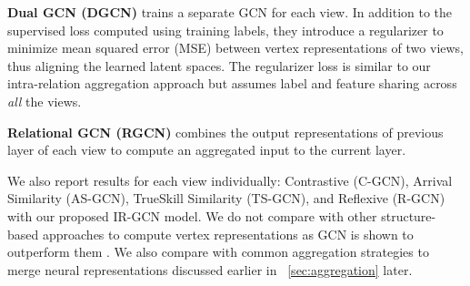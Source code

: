 \noindent
\textbf{Dual GCN (DGCN)} \cite{DualGCN} trains a separate GCN for each view. In addition to the supervised loss computed using training labels, they introduce a regularizer to minimize mean squared error (MSE) between vertex representations of two views, thus aligning the learned latent spaces.
The regularizer loss is similar to our intra-relation aggregation approach but assumes label and feature sharing across \emph{all} the views.

\noindent
\textbf{Relational GCN (RGCN)} \cite{relationalGCN} combines the output representations of previous layer of each view to compute an aggregated input to the current layer.
%

We also report results for each view individually: Contrastive (C-GCN), Arrival Similarity (AS-GCN), TrueSkill Similarity (TS-GCN), and Reflexive (R-GCN) with our proposed IR-GCN model. We do not compare with other structure-based approaches to compute vertex representations \cite{DeepWalk,node2vec,LINE} as GCN is shown to outperform them \cite{gcn}. We also compare with common aggregation strategies to merge neural representations discussed earlier in ~\cref{sec:aggregation} later.

